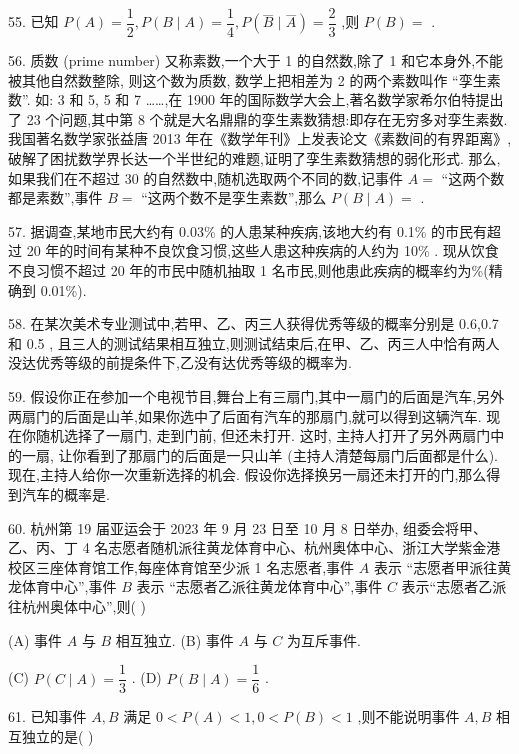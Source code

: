 55. 已知 $P\left( A\right)  = \dfrac{1}{2},P\left( {B \mid  A}\right)  = \dfrac{1}{4},P\left( {\overset{―}{B} \mid  \overset{―}{A}}\right)  = \dfrac{2}{3}$ ,则 $P\left( B\right)  =$ \blkda{}.

56. 质数 (prime number) 又称素数,一个大于 1 的自然数,除了 1 和它本身外,不能被其他自然数整除, 则这个数为质数, 数学上把相差为 2 的两个素数叫作 “孪生素数”. 如: 3 和 5, 5 和 7 ……,在 1900 年的国际数学大会上,著名数学家希尔伯特提出了 23 个问题,其中第 8 个就是大名鼎鼎的孪生素数猜想:即存在无穷多对孪生素数. 我国著名数学家张益唐 2013 年在《数学年刊》上发表论文《素数间的有界距离》,破解了困扰数学界长达一个半世纪的难题,证明了孪生素数猜想的弱化形式. 那么,如果我们在不超过 30 的自然数中,随机选取两个不同的数,记事件 $A =$ “这两个数都是素数”,事件 $B =$ “这两个数不是孪生素数”,那么 $P\left( {B \mid  A}\right)  =$ \blkda{}.

57. 据调查,某地市民大约有 0.03\% 的人患某种疾病,该地大约有 0.1\% 的市民有超过 20 年的时间有某种不良饮食习惯,这些人患这种疾病的人约为 10\% . 现从饮食不良习惯不超过 20 年的市民中随机抽取 1 名市民,则他患此疾病的概率约为\blkda{}\%(精确到 0.01\%).

58. 在某次美术专业测试中,若甲、乙、丙三人获得优秀等级的概率分别是 0.6,0.7 和 0.5 , 且三人的测试结果相互独立,则测试结束后,在甲、乙、丙三人中恰有两人没达优秀等级的前提条件下,乙没有达优秀等级的概率为\blkda{}.

59. 假设你正在参加一个电视节目,舞台上有三扇门,其中一扇门的后面是汽车,另外两扇门的后面是山羊,如果你选中了后面有汽车的那扇门,就可以得到这辆汽车. 现在你随机选择了一扇门, 走到门前, 但还未打开. 这时, 主持人打开了另外两扇门中的一扇, 让你看到了那扇门的后面是一只山羊 (主持人清楚每扇门后面都是什么). 现在,主持人给你一次重新选择的机会. 假设你选择换另一扇还未打开的门,那么得到汽车的概率是\blkda{}.

60. 杭州第 19 届亚运会于 2023 年 9 月 23 日至 10 月 8 日举办, 组委会将甲、乙、丙、丁 4 名志愿者随机派往黄龙体育中心、杭州奥体中心、浙江大学紫金港校区三座体育馆工作,每座体育馆至少派 1 名志愿者,事件 $A$ 表示 “志愿者甲派往黄龙体育中心”,事件 $B$ 表示 “志愿者乙派往黄龙体育中心”,事件 $C$ 表示“志愿者乙派往杭州奥体中心”,则(   )

(A) 事件 $A$ 与 $B$ 相互独立. (B) 事件 $A$ 与 $C$ 为互斥事件.

(C) $P\left( {C \mid  A}\right)  = \dfrac{1}{3}$ . (D) $P\left( {B \mid  A}\right)  = \dfrac{1}{6}$ .

61. 已知事件 $A,B$ 满足 $0 < P\left( A\right)  < 1,0 < P\left( B\right)  < 1$ ,则不能说明事件 $A,B$ 相互独立的是(   )


